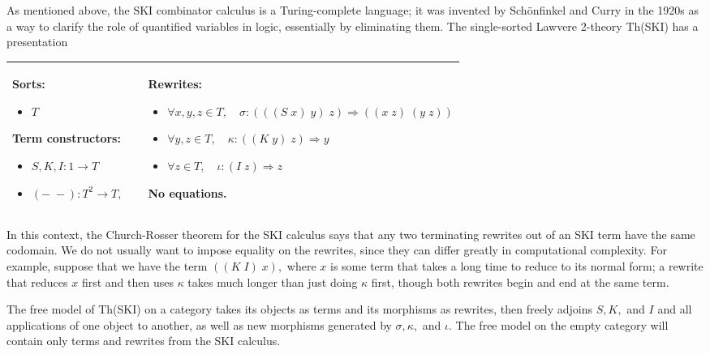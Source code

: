 \documentclass{llncs}
\newcommand{\maps}{\colon}
\begin{document}
As mentioned above, the SKI combinator calculus is a Turing-complete language; it was invented by Sch\"onfinkel \cite{Schonfinkel} and Curry \cite{Curry} in the 1920s as a way to clarify the role of quantified variables in logic, essentially by eliminating them.  The single-sorted Lawvere 2-theory Th(SKI) has a presentation
\begin{center}
  \begin{longtable}{|p{0.3\linewidth}|p{0.7\linewidth}|}
    \hline
    Sorts:
    \begin{itemize}
      \item $T$
    \end{itemize}
    Term constructors:
    \begin{itemize}
      \item $S, K, I\maps 1 \to T$
      \item $(-\;-)\maps T^2 \to T,$
    \end{itemize}
    &
    Rewrites:
    \begin{itemize}
      \item $\forall x,y,z \in T, \quad \sigma \maps (((S\; x)\; y)\; z) \Rightarrow ((x\; z)\; (y\; z))$
      \item $\forall y,z \in T, \quad \kappa \maps ((K\; y)\; z) \Rightarrow y$
      \item $\forall z \in T, \quad \iota \maps (I\; z) \Rightarrow z$
    \end{itemize}
    No equations.\\
    \hline
  \end{longtable}
\end{center}
In this context, the Church-Rosser theorem for the SKI calculus says that any two terminating rewrites out of an SKI term have the same codomain.  We do not usually want to impose equality on the rewrites, since they can differ greatly in computational complexity.  For example, suppose that we have the term $((K\; I)\; x),$ where $x$ is some term that takes a long time to reduce to its normal form; a rewrite that reduces $x$ first and then uses $\kappa$ takes much longer than just doing $\kappa$ first, though both rewrites begin and end at the same term.

The free model of Th(SKI) on a category takes its objects as terms and its morphisms as rewrites, then freely adjoins $S,K,$ and $I$ and all applications of one object to another, as well as new morphisms generated by $\sigma,\kappa,$ and $\iota.$  The free model on the empty category will contain only terms and rewrites from the SKI calculus.
\end{document}

